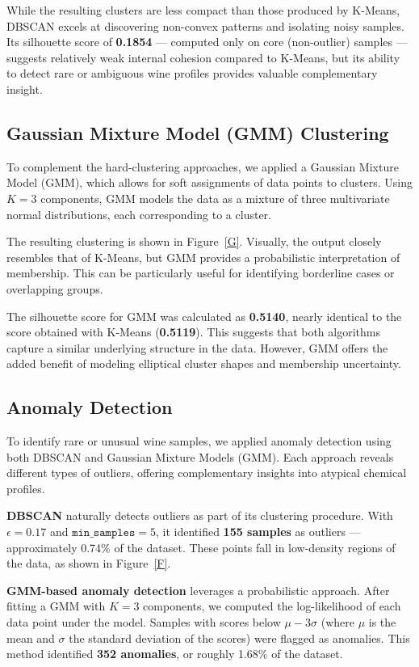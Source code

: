 \documentclass[12pt]{article}
\begin{document}
While the resulting clusters are less compact than those produced by K-Means, DBSCAN excels at discovering non-convex patterns and isolating noisy samples. 
Its silhouette score of \textbf{0.1854} — computed only on core (non-outlier) samples — suggests relatively weak internal cohesion compared to K-Means, but its ability to detect rare or ambiguous wine profiles provides valuable complementary insight.

\subsection*{Gaussian Mixture Model (GMM) Clustering}

To complement the hard-clustering approaches, we applied a Gaussian Mixture Model (GMM), which allows for soft assignments of data points to clusters. Using $K=3$ components, GMM models the data as a mixture of three multivariate normal distributions, each corresponding to a cluster.

The resulting clustering is shown in Figure~\ref{G}. Visually, the output closely resembles that of K-Means, but GMM provides a probabilistic interpretation of membership. This can be particularly useful for identifying borderline cases or overlapping groups.

The silhouette score for GMM was calculated as \textbf{0.5140}, nearly identical to the score obtained with K-Means
(\textbf{0.5119}). This suggests that both algorithms capture a similar underlying structure in the data. However, GMM offers the added benefit of modeling elliptical cluster shapes and membership uncertainty.

\subsection*{Anomaly Detection}

To identify rare or unusual wine samples, we applied anomaly detection using both DBSCAN and Gaussian Mixture Models (GMM). Each approach reveals different types of outliers, offering complementary insights into atypical chemical profiles.

\textbf{DBSCAN} naturally detects outliers as part of its clustering procedure. With $\epsilon = 0.17$ and $\texttt{min\_samples} = 5$, it identified \textbf{155 samples} as outliers — approximately 0.74\% of the dataset. These points fall in low-density regions of the data, as shown in Figure~\ref{F}.

\textbf{GMM-based anomaly detection} leverages a probabilistic approach. After fitting a GMM with $K=3$ components, we computed the log-likelihood of each data point under the model. Samples with scores below $\mu - 3\sigma$ (where $\mu$ is the mean and $\sigma$ the standard deviation of the scores) were flagged as anomalies. This method identified \textbf{352 anomalies}, or roughly 1.68\% of the dataset.
\end{document}

